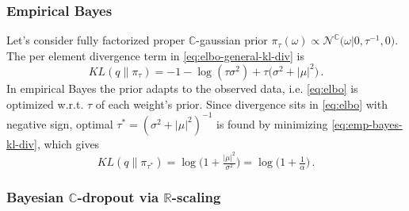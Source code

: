 \documentclass[a4paper,10pt]{article}
\newcommand{\real}{\mathbb{R}}
\newcommand{\cplx}{\mathbb{C}}
\newcommand{\tr}[1]{\mathop{tr}{#1}}
\begin{document}

\subsubsection{Empirical Bayes} %
\label{ssub:empirical_bayes}

Let's consider fully factorized proper $\cplx$-gaussian prior $
  \pi_\tau(\omega)
    \propto \mathcal{N}^{\cplx}\bigl(
      \omega \vert 0, \tau^{-1}, 0
    \bigr)
$. The per element divergence term in \eqref{eq:elbo-general-kl-div} is
\begin{equation}  \label{eq:emp-bayes-kl-div}
  KL(q \| \pi_\tau)
    = - 1 - \log{(\tau \sigma^2)}
      + \tau \bigl(
        \sigma^2 + \lvert \mu \rvert^2
      \bigr)
    \,.
\end{equation}
%
%
In empirical Bayes the prior adapts to the observed data, i.e. \eqref{eq:elbo} is optimized
w.r.t. $\tau$ of each weight's prior. Since divergence sits in \eqref{eq:elbo} with negative
sign, optimal $
  \tau^\ast = (\sigma^2 + \lvert \mu \rvert^2)^{-1}
$ is found by minimizing \eqref{eq:emp-bayes-kl-div}, which gives
\begin{equation}  \label{eq:emp-bayes-opt-kl}
  KL(q \| \pi_{\tau^\ast})
    = \log{\bigl(1 + \tfrac{\lvert \mu \rvert^2}{\sigma^2}\bigr)}
    = \log{\bigl(1 + \tfrac1\alpha \bigr)}
    \,.
\end{equation}


\subsubsection{Bayesian $\cplx$-dropout via $\real$-scaling} %
\label{ssub:real_scaling_dropout}
\end{document}
